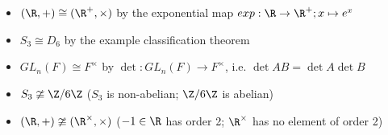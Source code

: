 \documentclass[11pt]{article}
\begin{document}
\begin{definition*}
\begin{itemize}
\begin{itemize}
            \item $(\R,+) \cong (\R^+, \times)$ by the exponential map $exp: \R \to \R^+; x \mapsto e^x$
            \item $S_3 \cong D_6$ by the example classification theorem
            \item $GL_n(F) \cong F^{\times}$ by $\det: GL_n(F) \to F^{\times}$, i.e. $\det{AB} = \det{A}\det{B}$
            \item $S_3 \ncong \integermodn[6]$ ($S_3$ is non-abelian; $\integermodn[6]$ is abelian)
            \item $(\R,+) \ncong (\R^{\times}, \times)$ ($-1\in \R$ has order 2; $\R^{\times}$ has no element of order 2)
        \end{itemize}
    \end{itemize}
\end{definition*}
\end{document}
